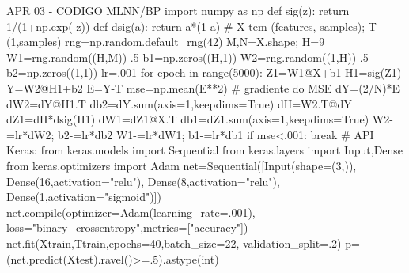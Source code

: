 APR 03 - CODIGO MLNN/BP
import numpy as np
def sig(z): return 1/(1+np.exp(-z))
def dsig(a): return a*(1-a)
# X tem (features, samples); T (1,samples)
rng=np.random.default_rng(42)
M,N=X.shape; H=9
W1=rng.random((H,M))-.5
b1=np.zeros((H,1))
W2=rng.random((1,H))-.5
b2=np.zeros((1,1))
lr=.001
for epoch in range(5000):
    Z1=W1@X+b1
    H1=sig(Z1)
    Y=W2@H1+b2
    E=Y-T
    mse=np.mean(E**2)
    # gradiente do MSE
    dY=(2/N)*E
    dW2=dY@H1.T
    db2=dY.sum(axis=1,keepdims=True)
    dH=W2.T@dY
    dZ1=dH*dsig(H1)
    dW1=dZ1@X.T
    db1=dZ1.sum(axis=1,keepdims=True)
    W2-=lr*dW2; b2-=lr*db2
    W1-=lr*dW1; b1-=lr*db1
    if mse<.001: break
# API Keras:
from keras.models import Sequential
from keras.layers import Input,Dense
from keras.optimizers import Adam
net=Sequential([Input(shape=(3,)),
 Dense(16,activation="relu"),
 Dense(8,activation="relu"),
 Dense(1,activation="sigmoid")])
net.compile(optimizer=Adam(learning_rate=.001),
 loss="binary_crossentropy",metrics=["accuracy"])
net.fit(Xtrain,Ttrain,epochs=40,batch_size=22,
 validation_split=.2)
p=(net.predict(Xtest).ravel()>=.5).astype(int)